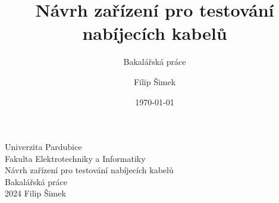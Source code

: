 \documentclass[14pt,a4paper,titlepage]{scrreprt}
\title{Návrh zařízení pro testování nabíjecích kabelů}
\subtitle{Bakalářská práce}
\author{Filip Šimek}
\date{\today}
\begin{document}
	\begin{titlepage}
		\begin{center}
			{Univerzita Pardubice}\\
			{Fakulta Elektrotechniky a Informatiky} \\
			\vfill
			{Návrh zařízení pro testování nabíjecích kabelů}\\ {Bakalářská práce} \\
			\vfill
			{2024} \hfill {Filip Šimek} \\
			\end{center}
\end{titlepage}
\end{document}
